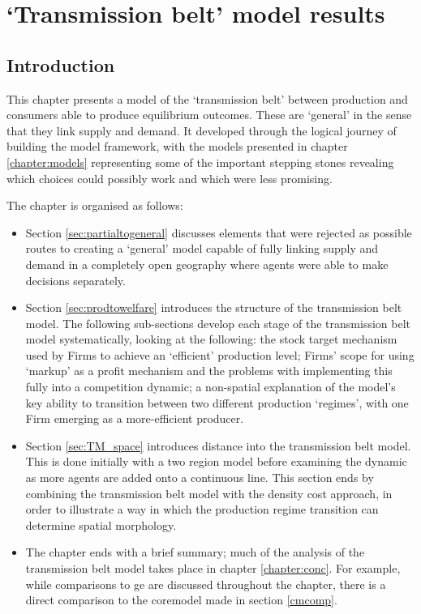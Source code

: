 \chapter{`Transmission belt' model results \label{chapter:connectedModels}} 

\section{Introduction}

This chapter presents a model of the `transmission belt' between production and consumers able to produce equilibrium outcomes. These are `general' in the sense that they link supply and demand. It developed through the logical journey of building the model framework, with the models presented in chapter \ref{chapter:models} representing some of the important stepping stones revealing which choices could possibly work and which were less promising. 

The chapter is organised as follows:

\begin{itemize}
	\item Section \ref{sec:partialtogeneral} discusses elements that were rejected as possible routes to creating a `general' model capable of fully linking supply and demand in a completely open geography where agents were able to make decisions separately.
	\item Section \ref{sec:prodtowelfare} introduces the structure of the transmission belt model. The following sub-sections develop each stage of the transmission belt model systematically, looking at the following: the stock target mechanism used by Firms to achieve an `efficient' production level; Firms' scope for using `markup' as a profit mechanism and the problems with implementing this fully into a competition dynamic; a non-spatial explanation of the model's key ability to transition between two different production `regimes', with one Firm emerging as a more-efficient producer.
	\item Section \ref{sec:TM_space} introduces distance into the transmission belt model. This is done initially with a two region model before examining the dynamic as more agents are added onto a continuous line. This section ends by combining the transmission belt model with the density cost approach, in order to illustrate a way in which the production regime transition can determine spatial morphology.
	\item The chapter ends with a brief summary; much of the analysis of the transmission belt model takes place in chapter \ref{chapter:conc}. For example, while comparisons to \gls{ge} are discussed throughout the chapter, there is a direct comparison to the \gls{coremodel} made in section \ref{cmcomp}.
\end{itemize}



